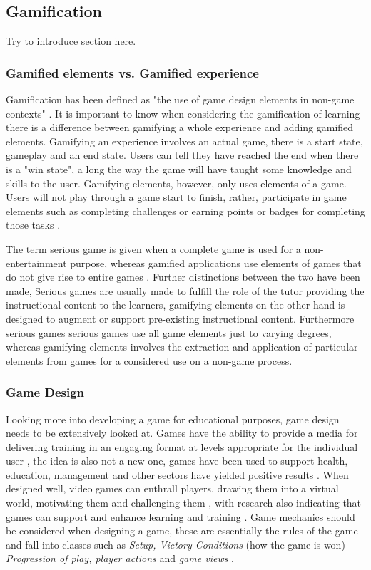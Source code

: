 \documentclass[12pt,a4paper]{article}
\begin{document}
\subsection{Gamification}
Try to introduce section here.

\subsubsection{Gamified elements vs. Gamified experience}
Gamification has been defined as "the use of game design elements in non-game contexts" \cite{deterding2011gamification}. It is important to know when considering the gamification of learning there is a difference between gamifying a whole experience and adding gamified elements. Gamifying an experience involves an actual game, there is a start state, gameplay and an end state. Users can tell they have reached the end when there is a "win state", a long the way the game will have taught some knowledge and skills to the user. Gamifying elements, however, only uses elements of a game. Users will not play through a game start to finish, rather, participate in game elements such as completing challenges or earning points or badges for completing those tasks \cite{kapp2012}.  


The term serious game is given when a complete game is used for a non-entertainment purpose, whereas gamified applications use elements of games that do not give rise to entire games \cite{deterding2011gamification}. Further distinctions between the two have been made, Serious games are usually made to fulfill the role of the tutor providing the instructional content to the learners, gamifying elements on the other hand is designed to augment or support pre-existing instructional content. Furthermore serious games serious games use all game elements just to varying degrees, whereas gamifying elements
involves the extraction and application of particular elements from games for a considered use on a non-game process\cite{landers2014developing}.  

\subsubsection{Game Design} 
Looking more into developing a game for educational purposes, game design needs to be extensively looked at. Games have the ability to provide a media for delivering training in an engaging format at levels appropriate for the individual user \cite{nagarajan2012exploring1}, the idea is also not a new one, games have been used to support health, education, management and other sectors have yielded positive results \cite{prensky2003digital}. When designed well, video games can enthrall players. drawing them into a virtual world, motivating them and challenging them \cite{nagarajan2012exploring2}, with research also indicating that games can support and enhance learning and training \cite{cone2007video}. Game mechanics should be considered when designing a game, these are essentially the rules of the game and fall into classes such as \emph{Setup, Victory Conditions} (how the game is won) \emph{Progression of play, player actions} and  \emph{game views} \cite{nagarajan2012exploring4}.
\end{document}
